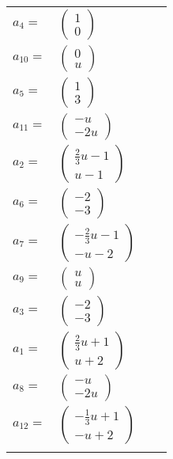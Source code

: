 \documentclass[1p]{elsarticle_modified}
\theoremstyle{definition}
\begin{document}
\begin{tabular}{m{7pt} m{180pt} m{7pt} m{180pt} }
\flushright $a_{4}=$&$\begin{pmatrix}1\\0\end{pmatrix}$ \\
\flushright $a_{10}=$&$\begin{pmatrix}0\\u\end{pmatrix}$ \\
\flushright $a_{5}=$&$\begin{pmatrix}1\\3\end{pmatrix}$ \\
\flushright $a_{11}=$&$\begin{pmatrix}- u\\-2 u\end{pmatrix}$ \\
\flushright $a_{2}=$&$\begin{pmatrix}\frac{2}{3} u-1\\u-1\end{pmatrix}$ \\
\flushright $a_{6}=$&$\begin{pmatrix}-2\\-3\end{pmatrix}$ \\
\flushright $a_{7}=$&$\begin{pmatrix}-\frac{2}{3} u-1\\- u-2\end{pmatrix}$ \\
\flushright $a_{9}=$&$\begin{pmatrix}u\\u\end{pmatrix}$ \\
\flushright $a_{3}=$&$\begin{pmatrix}-2\\-3\end{pmatrix}$ \\
\flushright $a_{1}=$&$\begin{pmatrix}\frac{2}{3} u+1\\u+2\end{pmatrix}$ \\
\flushright $a_{8}=$&$\begin{pmatrix}- u\\-2 u\end{pmatrix}$ \\
\flushright $a_{12}=$&$\begin{pmatrix}-\frac{1}{3} u+1\\- u+2\end{pmatrix}$\\&\end{tabular}
\end{document}
